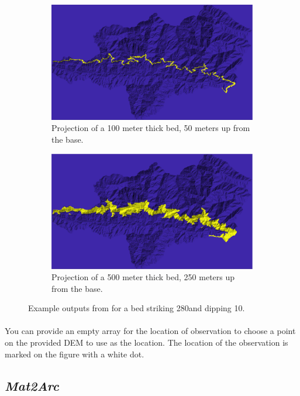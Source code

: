 \begin{figure}[H]
	\centering
	\begin{subfigure}{.5\textwidth}
		\centering
		\includegraphics[width=.8\linewidth]{PNGs/Bed1.png}
		\caption{Projection of a 100 meter thick bed, 50 meters up from the base.}
		\label{fig:BedSub1}
	\end{subfigure}%
	\begin{subfigure}{.5\textwidth}
		\centering
		\includegraphics[width=.8\linewidth]{PNGs/Bed2.png}
		\caption{Projection of a 500 meter thick bed, 250 meters up from the base.}
		\label{fig:BedSub2}
	\end{subfigure}
	\caption{Example outputs from  for a bed striking 280\textdegree and dipping 10\textdegree.}
	\label{fig:Bed}
\end{figure}

\paragraph{}You can provide an empty array for the location of observation to choose a point on the provided DEM to use as the location. The location of the observation is marked on the figure with a white dot.

\subsection{\textit{Mat2Arc}} \label{sec:Mat2Arc}
